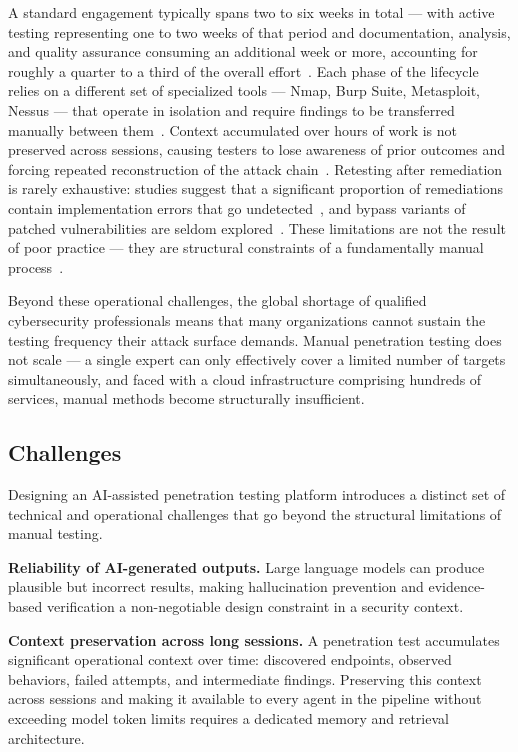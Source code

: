 \documentclass[12pt,a4paper]{report}
\begin{document}
A standard engagement typically spans two to six weeks in total --- with active
testing representing one to two weeks of that period and documentation, analysis,
and quality assurance consuming an additional week or more, accounting for roughly
a quarter to a third of the overall effort~\cite{triaxiomTimeline,valuementorLifecycle}.
Each phase of the lifecycle relies on a different set of specialized tools --- Nmap,
Burp Suite, Metasploit, Nessus --- that operate in isolation and require findings to
be transferred manually between them~\cite{autosecagent2026,emazzantiTools}. Context
accumulated over hours of work is not preserved across sessions, causing testers to
lose awareness of prior outcomes and forcing repeated reconstruction of the attack
chain~\cite{pentestgpt2023}. Retesting after remediation is rarely exhaustive: studies
suggest that a significant proportion of remediations contain implementation errors
that go undetected~\cite{hedgehogRetesting}, and bypass variants of patched
vulnerabilities are seldom explored~\cite{redleggRetesting,halockVerification}. These
limitations are not the result of poor practice --- they are structural constraints of
a fundamentally manual process~\cite{autosecagent2026,cycognitoPentest}.

Beyond these operational challenges, the global shortage of qualified cybersecurity
professionals means that many organizations cannot sustain the testing frequency
their attack surface demands. Manual penetration testing does not scale --- a single
expert can only effectively cover a limited number of targets simultaneously, and
faced with a cloud infrastructure comprising hundreds of services, manual methods
become structurally insufficient.

\subsection{Challenges}

Designing an AI-assisted penetration testing platform introduces a distinct set of
technical and operational challenges that go beyond the structural limitations of
manual testing.

\textbf{Reliability of AI-generated outputs.} Large language models can produce
plausible but incorrect results, making hallucination prevention and evidence-based
verification a non-negotiable design constraint in a security context.

\textbf{Context preservation across long sessions.} A penetration test accumulates
significant operational context over time: discovered endpoints, observed behaviors,
failed attempts, and intermediate findings. Preserving this context across sessions
and making it available to every agent in the pipeline without exceeding model token
limits requires a dedicated memory and retrieval architecture.
\end{document}
